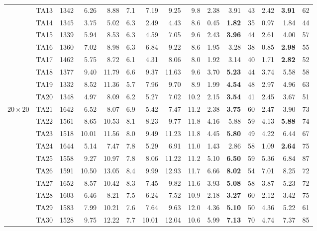\begin{table}[p]
\begin{tabular}{ll r | rr r | rr r | rr r | rr r}
 & TA13 & 1342 & 6.26 & 8.88 & 7.1 & 7.19 & 9.25 & 9.8 & 2.38 & 3.91 & 43 & 2.42 & \textbf{3.91} & 62 \\
 & TA14 & 1345 & 3.75 & 5.02 & 6.3 & 2.49 & 4.43 & 8.6 & 0.45 & \textbf{1.82} & 35 & 0.97 & 1.84 & 44 \\
 & TA15 & 1339 & 5.94 & 8.53 & 6.3 & 4.59 & 7.05 & 9.6 & 2.43 & \textbf{3.96} & 44 & 2.61 & 4.00 & 57 \\
 & TA16 & 1360 & 7.02 & 8.98 & 6.3 & 6.84 & 9.22 & 8.6 & 1.95 & 3.28 & 38 & 0.85 & \textbf{2.98} & 55 \\
 & TA17 & 1462 & 5.75 & 8.72 & 6.1 & 4.31 & 8.06 & 8.0 & 1.92 & 3.14 & 40 & 1.71 & \textbf{2.82} & 52 \\
 & TA18 & 1377 & 9.40 & 11.79 & 6.6 & 9.37 & 11.63 & 9.6 & 3.70 & \textbf{5.23} & 44 & 3.74 & 5.58 & 58 \\
 & TA19 & 1332 & 8.52 & 11.36 & 5.7 & 7.96 & 9.70 & 8.9 & 1.99 & \textbf{4.54} & 48 & 2.97 & 4.96 & 63 \\
 & TA20 & 1348 & 4.97 & 8.09 & 6.2 & 5.27 & 7.02 & 10.2 & 2.15 & \textbf{3.54} & 41 & 2.45 & 3.67 & 51 \\
\hline
$20\times20$ & TA21 & 1642 & 6.52 & 8.07 & 6.9 & 5.42 & 7.47 & 11.2 & 2.38 & \textbf{3.75} & 60 & 2.47 & 3.90 & 73 \\
 & TA22 & 1561 & 8.65 & 10.53 & 8.1 & 8.23 & 9.77 & 11.8 & 4.16 & 5.88 & 59 & 4.13 & \textbf{5.88} & 74 \\
 & TA23 & 1518 & 10.01 & 11.56 & 8.0 & 9.49 & 11.23 & 11.8 & 4.45 & \textbf{5.80} & 49 & 4.22 & 6.44 & 67 \\
 & TA24 & 1644 & 5.14 & 7.47 & 7.8 & 5.29 & 6.91 & 11.0 & 1.43 & 2.86 & 58 & 1.09 & \textbf{2.64} & 75 \\
 & TA25 & 1558 & 9.27 & 10.97 & 7.8 & 8.06 & 11.22 & 11.2 & 5.10 & \textbf{6.50} & 59 & 5.36 & 6.84 & 87 \\
 & TA26 & 1591 & 10.50 & 13.05 & 8.4 & 9.99 & 12.93 & 11.7 & 6.66 & \textbf{8.02} & 54 & 7.01 & 8.25 & 72 \\
 & TA27 & 1652 & 8.57 & 10.42 & 8.3 & 7.45 & 9.82 & 11.6 & 3.93 & \textbf{5.08} & 58 & 3.87 & 5.23 & 72 \\
 & TA28 & 1603 & 6.46 & 8.21 & 7.5 & 6.24 & 7.52 & 10.9 & 2.18 & \textbf{3.27} & 60 & 2.12 & 3.42 & 75 \\
 & TA29 & 1583 & 7.99 & 10.21 & 7.6 & 7.64 & 9.63 & 12.0 & 4.36 & \textbf{5.10} & 50 & 4.36 & 5.22 & 61 \\
 & TA30 & 1528 & 9.75 & 12.22 & 7.7 & 10.01 & 12.04 & 10.6 & 5.99 & \textbf{7.13} & 70 & 4.74 & 7.37 & 85 \\

\end{tabular}
\end{table}
